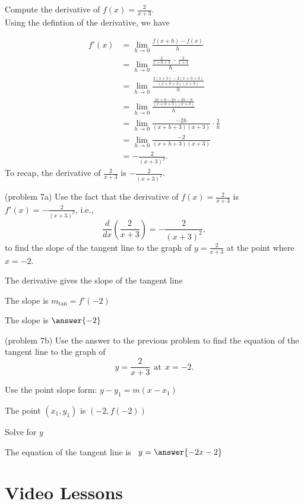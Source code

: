 \documentclass{ximera}
\begin{document}
\begin{example}[example 7]
Compute the derivative of $f(x) = \displaystyle{\frac{2}{x+3}}$.\\
Using the defintion of the derivative, we have

\begin{align*}
f'(x) &= \lim_{h \to 0} \frac{f(x+h)-f(x)}{h}\\[5pt]
&= \lim_{h \to 0} \frac{\frac{2}{x+h +3}- \frac{2}{x+3}}{h}\\[5pt]
&= \lim_{h \to 0} \frac{\frac{2(x+3) - 2(x+h+3)}{(x+h+3)(x+3)}}{h} \\[5pt]
&= \lim_{h \to 0} \frac{\frac{2x+6 - 2x-2h-6}{(x+h+3)(x+3)}}{h} \\[5pt]
&=  \lim_{h \to 0} \frac{-2h}{(x+h+3)(x+3)}\cdot \frac{1}{h}\\[5pt]
&= \lim_{h \to 0} \frac{-2}{(x+h+3)(x+3)} \\[5pt]
&= -\frac{2}{(x+3)^2}.
\end{align*}
To recap, the derivative of $\displaystyle{\frac{2}{x+3}}$ is $\displaystyle{-\frac{2}{(x+3)^2}}$.
\end{example}




\begin{problem}(problem 7a)
Use the fact that the derivative of $f(x) = \frac{2}{x+3}$ is $f'(x) = -\frac{2}{(x+3)^2}$,
i.e., 
\[
\frac{d}{dx}\left(\frac{2}{x+3}\right) = -\frac{2}{(x+3)^2},
\]
to find the slope of the tangent line to the graph of 
$y = \frac{2}{x+3}$ at the point where $x = -2$.\\
\begin{hint}
The derivative gives the slope of the tangent line
\end{hint}
\begin{hint}
The slope is $m_{\text{tan}} = f'(-2)$
\end{hint}
The slope is $\answer{-2}$
\end{problem}




\begin{problem}(problem 7b)
Use the answer to the previous problem to find the equation of the tangent line to the graph of 
\[
y = \frac{2}{x+3} \  \  \text{at} \  \ x=-2.
\]

\begin{hint}
Use the point slope form: $y-y_1 = m(x-x_1)$
\end{hint}
\begin{hint}
The point $(x_1,y_1)$ is $(-2, f(-2))$
\end{hint}
\begin{hint}
Solve for $y$
\end{hint}
The equation of the tangent line is \  $y = \answer{-2x-2}$
\end{problem}






\section{Video Lessons}

\begin{center}
\begin{foldable}
\end{foldable}
\end{center}
\end{document}
